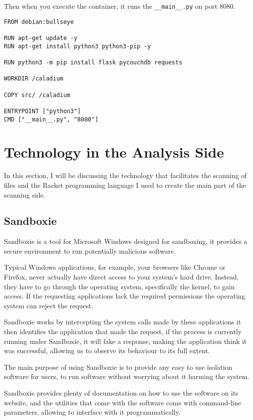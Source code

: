Then when you execute the container,
it runs the \texttt{\_\_main\_\_.py} on port 8080.

\begin{lstlisting}
FROM debian:bullseye

RUN apt-get update -y
RUN apt-get install python3 python3-pip -y

RUN python3 -m pip install flask pycouchdb requests

WORKDIR /caladium

COPY src/ /caladium

ENTRYPOINT ["python3"]
CMD ["__main__.py", "8080"]
\end{lstlisting}

\section{Technology in the Analysis Side}
In this section, I will be discussing the technology that
facilitates the scanning of files and the Racket programming language
I used to create the main part of the scanning side.

\subsection{Sandboxie}
Sandboxie is a tool for Microsoft Windows designed for sandboxing,
it provides a secure environment to run potentially malicious software.

Typical Windows applications, for example, your browsers like Chrome or Firefox,
never actually have direct access to your system's hard drive.
Instead, they have to go through the operating system, specifically the kernel,
to gain access. If the requesting applications lack the required permissions
the operating system can reject the request.

Sandboxie works by intercepting the system calls made by these applications
it then identifies the application that made the request,
if the process is currently running under Sandboxie,
it will fake a response, making the application think it was successful,
allowing us to observe its behaviour to its full extent.

The main purpose of using Sandboxie is to provide any
easy to use isolation software for users, to run software
without worrying about it harming the system.

Sandboxie provides plenty of documentation on how to use the software on its website,
and the utilities that come with the software come with command-line parameters,
allowing to interface with it programmatically.

